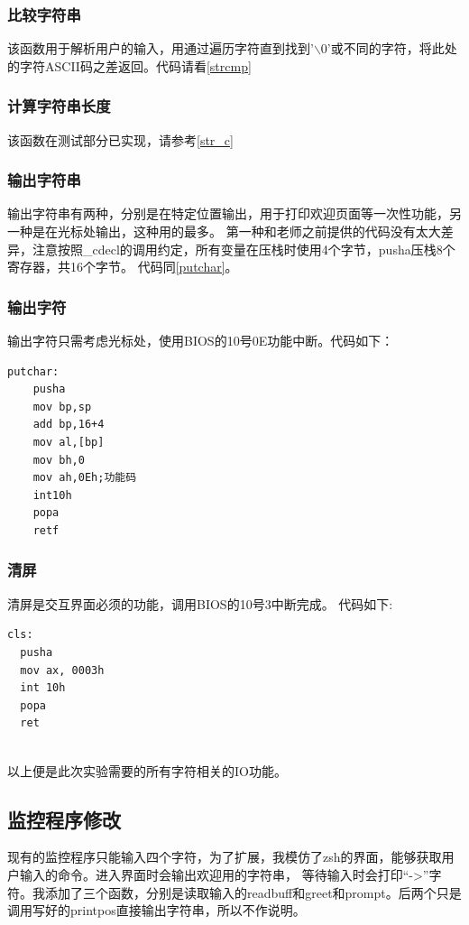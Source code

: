 \documentclass[a4paper, 11pt]{article} %
\begin{document}
\subsubsection{比较字符串}
该函数用于解析用户的输入，用通过遍历字符直到找到'$\backslash$0'或不同的字符，将此处的字符ASCII码之差返回。代码请看\ref{strcmp}

\subsubsection{计算字符串长度}
该函数在测试部分已实现，请参考\ref{str_c}

\subsubsection{输出字符串}
输出字符串有两种，分别是在特定位置输出，用于打印欢迎页面等一次性功能，另一种是在光标处输出，这种用的最多。
第一种和老师之前提供的代码没有太大差异，注意按照\_cdecl的调用约定，所有变量在压栈时使用4个字节，pusha压栈8个寄存器，共16个字节。
代码同\ref{putchar}。

\subsubsection{输出字符}
输出字符只需考虑光标处，使用BIOS的10号0E功能中断。代码如下：
\begin{lstlisting}[language={[x86masm]Assembler},label=putchar,caption=putchar]
putchar:
    pusha
    mov bp,sp
    add bp,16+4
    mov al,[bp]
    mov bh,0
    mov ah,0Eh;功能码
    int10h
    popa
    retf
\end{lstlisting}

\subsubsection{清屏}

清屏是交互界面必须的功能，调用BIOS的10号3中断完成。
代码如下:
\begin{lstlisting}[language={[x86masm]Assembler},caption=字符串输出宏]
  cls:
  pusha
  mov ax, 0003h
  int 10h
  popa
  ret
  
\end{lstlisting}
以上便是此次实验需要的所有字符相关的IO功能。

\subsection{监控程序修改}

现有的监控程序只能输入四个字符，为了扩展，我模仿了zsh的界面，能够获取用户输入的命令。进入界面时会输出欢迎用的字符串，
等待输入时会打印“->”字符。我添加了三个函数，分别是读取输入的readbuff和greet和prompt。后两个只是调用写好的printpos直接输出字符串，所以不作说明。
\end{document}
